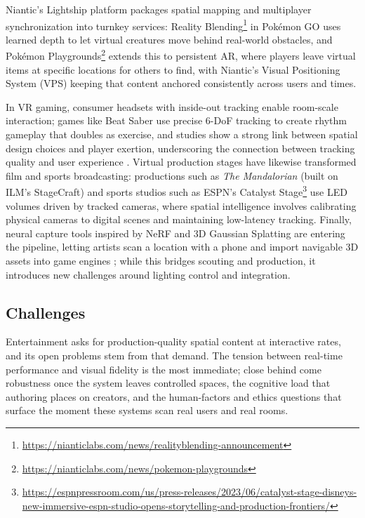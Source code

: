 Niantic's Lightship platform packages spatial mapping and multiplayer synchronization into turnkey services: Reality Blending\footnote{\url{https://nianticlabs.com/news/realityblending-announcement}} in Pok\'emon GO uses learned depth to let virtual creatures move behind real-world obstacles, and Pok\'emon Playgrounds\footnote{\url{https://nianticlabs.com/news/pokemon-playgrounds}} extends this to persistent AR, where players leave virtual items at specific locations for others to find, with Niantic's Visual Positioning System (VPS) keeping that content anchored consistently across users and times.

In VR gaming, consumer headsets with inside-out tracking enable room-scale interaction; games like Beat Saber use precise 6-DoF tracking to create rhythm gameplay that doubles as exercise, and studies show a strong link between spatial design choices and player exertion, underscoring the connection between tracking quality and user experience \cite{dongas2023vrrhythm}. 
Virtual production stages have likewise transformed film and sports broadcasting: productions such as \emph{The Mandalorian} (built on ILM's StageCraft) and sports studios such as ESPN's Catalyst Stage\footnote{\url{https://espnpressroom.com/us/press-releases/2023/06/catalyst-stage-disneys-new-immersive-espn-studio-opens-storytelling-and-production-frontiers/}} use LED volumes driven by tracked cameras, where spatial intelligence involves calibrating physical cameras to digital scenes and maintaining low-latency tracking. 
Finally, neural capture tools inspired by NeRF and 3D Gaussian Splatting are entering the pipeline, letting artists scan a location with a phone and import navigable 3D assets into game engines \cite{muller2022instant,kerbl20233d}; while this bridges scouting and production, it introduces new challenges around lighting control and integration.

\subsection{Challenges}
\label{subsec:p4-sec10-2-challenges}

Entertainment asks for production-quality spatial content at interactive rates, and its open problems stem from that demand. The tension between real-time performance and visual fidelity is the most immediate; close behind come robustness once the system leaves controlled spaces, the cognitive load that authoring places on creators, and the human-factors and ethics questions that surface the moment these systems scan real users and real rooms.

